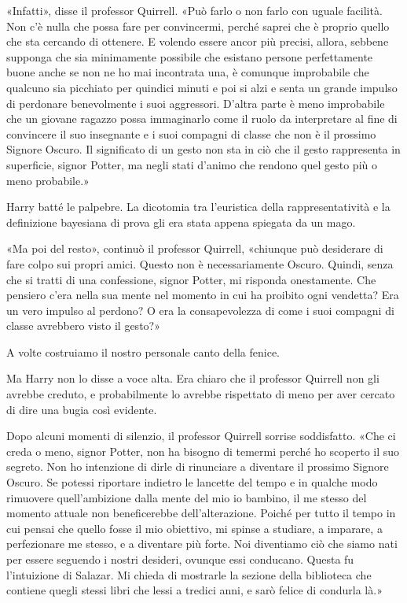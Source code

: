 «Infatti», disse il professor Quirrell. «Può farlo o non farlo con uguale facilità. Non c’è nulla che possa fare per convincermi, perché saprei che è proprio quello che sta cercando di ottenere. E volendo essere ancor più precisi, allora, sebbene supponga che sia minimamente possibile che esistano persone perfettamente buone anche se non ne ho mai incontrata una, è comunque improbabile che qualcuno sia picchiato per quindici minuti e poi si alzi e senta un grande impulso di perdonare benevolmente i suoi aggressori. D’altra parte è meno improbabile che un giovane ragazzo possa immaginarlo come il ruolo da interpretare al fine di convincere il suo insegnante e i suoi compagni di classe che non è il prossimo Signore Oscuro. Il significato di un gesto non sta in ciò che il gesto rappresenta in superficie, signor Potter, ma negli stati d’animo che rendono quel gesto più o meno probabile.»

Harry batté le palpebre. La dicotomia tra l’euristica della rappresentatività e la definizione bayesiana di prova gli era stata appena spiegata da un mago.

«Ma poi del resto», continuò il professor Quirrell, «chiunque può desiderare di fare colpo sui propri amici. Questo non è necessariamente Oscuro. Quindi, senza che si tratti di una confessione, signor Potter, mi risponda onestamente. Che pensiero c’era nella sua mente nel momento in cui ha proibito ogni vendetta? Era un vero impulso al perdono? O era la consapevolezza di come i suoi compagni di classe avrebbero visto il gesto?»

A volte costruiamo il nostro personale canto della fenice.

Ma Harry non lo disse a voce alta. Era chiaro che il professor Quirrell non gli avrebbe creduto, e probabilmente lo avrebbe rispettato di meno per aver cercato di dire una bugia così evidente.

Dopo alcuni momenti di silenzio, il professor Quirrell sorrise soddisfatto. «Che ci creda o meno, signor Potter, non ha bisogno di temermi perché ho scoperto il suo segreto. Non ho intenzione di dirle di rinunciare a diventare il prossimo Signore Oscuro. Se potessi riportare indietro le lancette del tempo e in qualche modo rimuovere quell’ambizione dalla mente del mio io bambino, il me stesso del momento attuale non beneficerebbe dell’alterazione. Poiché per tutto il tempo in cui pensai che quello fosse il mio obiettivo, mi spinse a studiare, a imparare, a perfezionare me stesso, e a diventare più forte. Noi diventiamo ciò che siamo nati per essere seguendo i nostri desideri, ovunque essi conducano. Questa fu l’intuizione di Salazar. Mi chieda di mostrarle la sezione della biblioteca che contiene quegli stessi libri che lessi a tredici anni, e sarò felice di condurla là.»

